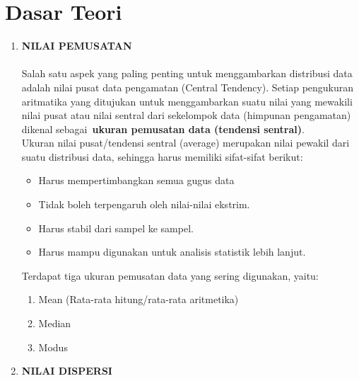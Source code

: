 \documentclass[a4paper,12pt]{article}
\begin{document}
\section{Dasar Teori}
\begin{enumerate}[label={\bfseries \Alph*.}]
	\item {\bfseries NILAI  PEMUSATAN}
	\paragraph{}
	Salah satu aspek yang paling penting untuk menggambarkan distribusi data adalah nilai pusat data pengamatan (Central Tendency). Setiap pengukuran aritmatika yang ditujukan untuk menggambarkan suatu nilai yang mewakili nilai pusat atau nilai sentral dari sekelompok  data (himpunan pengamatan) dikenal sebagai \textbf{ukuran pemusatan data (tendensi sentral)}.\\
	Ukuran nilai pusat/tendensi sentral (average) merupakan nilai pewakil dari suatu distribusi data, sehingga harus memiliki sifat-sifat berikut:
	\begin{itemize}
		\item Harus mempertimbangkan semua gugus data
		\item Tidak boleh terpengaruh oleh nilai-nilai ekstrim.
		\item Harus stabil dari sampel ke sampel.
		\item Harus mampu digunakan untuk analisis statistik lebih lanjut.
	
	\end{itemize}
	Terdapat tiga ukuran pemusatan data yang sering digunakan, yaitu:
	\begin{enumerate}[label=\alph*.]
		\item Mean (Rata-rata hitung/rata-rata aritmetika)
		\item Median
		\item Modus
	\end{enumerate}
	\item {\bfseries NILAI DISPERSI}

\end{enumerate}
\end{document}
